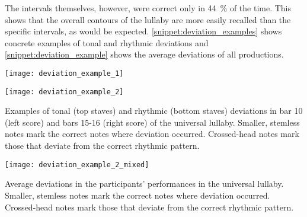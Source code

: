 The intervals themselves, however, were correct only in \SI{44}{\percent} of the time.
This shows that the overall contours of the lullaby are more easily recalled than the specific intervals, as would be expected.
\cref{snippet:deviation_examples} shows concrete examples of tonal and rhythmic deviations and \cref{snippet:deviation_example} shows the average deviations of all productions.
\begin{snippet}[t]
	\begin{minipage}{.41\linewidth}
		\centering
		\texttt{[image: deviation\_example\_1]}
	\end{minipage}%
	\hfill
	\begin{minipage}{.49\linewidth}
		\centering
		\texttt{[image: deviation\_example\_2]}
	\end{minipage}%
	\caption[Examples of tonal and rhythmic deviations]
		{Examples of tonal (top staves) and rhythmic (bottom staves) deviations in bar 10 (left score) and bars 15-16 (right score) of the universal lullaby.
		Smaller, stemless notes mark the correct notes where deviation occurred.
		Crossed-head notes mark those that deviate from the correct rhythmic pattern.}
	\label{snippet:deviation_examples}
\end{snippet}
%
\begin{snippet}[b]
	\centering
	\texttt{[image: deviation\_example\_2\_mixed]}
	\caption[Average tonal and rhythmic deviations]
		{Average deviations in the participants' performances in the universal lullaby.
		Smaller, stemless notes mark the correct notes where deviation occurred.
		Crossed-head notes mark those that deviate from the correct rhythmic pattern.}
	\label{snippet:deviation_example}
\end{snippet}
%
